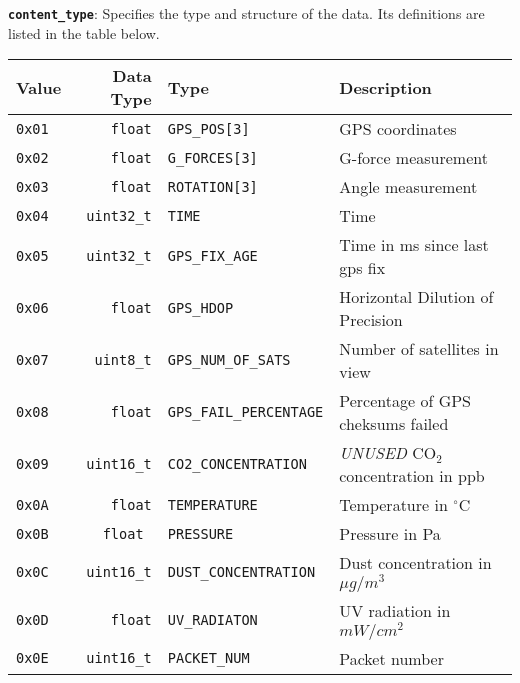 \documentclass[a4paper]{article}
\begin{document}
\textbf{\texttt{content\_type}}: Specifies the type and structure of the data. Its definitions are listed in the table below.
\newpage
\begin{longtable}{@{}lrll@{}}
  \toprule
  Value         & Data Type         & Type                           & Description                      \\
  \midrule
  \texttt{0x01} & \texttt{float}    &\texttt{GPS\_POS[3]}            & GPS coordinates                          \\
  \texttt{0x02} & \texttt{float}    &\texttt{G\_FORCES[3]}           & G-force measurement                      \\
  \texttt{0x03} & \texttt{float}    &\texttt{ROTATION[3]}            & Angle measurement                        \\
  \texttt{0x04} & \texttt{uint32\_t}&\texttt{TIME}                   & Time                                     \\
  \texttt{0x05} & \texttt{uint32\_t}&\texttt{GPS\_FIX\_AGE}          & Time in ms since last gps fix            \\
  \texttt{0x06} & \texttt{float}    &\texttt{GPS\_HDOP}              & Horizontal Dilution of Precision         \\
  \texttt{0x07} & \texttt{uint8\_t} &\texttt{GPS\_NUM\_OF\_SATS}     & Number of satellites in view             \\
  \texttt{0x08} & \texttt{float}    &\texttt{GPS\_FAIL\_PERCENTAGE}  & Percentage of GPS cheksums failed        \\
  \texttt{0x09} & \texttt{uint16\_t}&\texttt{CO2\_CONCENTRATION}     & \emph{UNUSED} CO$_2$ concentration in ppb\\
  \texttt{0x0A} & \texttt{float}    &\texttt{TEMPERATURE}            & Temperature in $^\circ$C                 \\
  \texttt{0x0B} & \texttt{float    }&\texttt{PRESSURE}               & Pressure in Pa                           \\
  \texttt{0x0C} & \texttt{uint16\_t}&\texttt{DUST\_CONCENTRATION}    & Dust concentration in $\mu g/m^3$        \\
  \texttt{0x0D} & \texttt{float}    &\texttt{UV\_RADIATON}           & UV radiation in $mW/cm^2$                \\
  \texttt{0x0E} & \texttt{uint16\_t}&\texttt{PACKET\_NUM}             & Packet number                            \\
  \bottomrule
\end{longtable}
\end{document}
